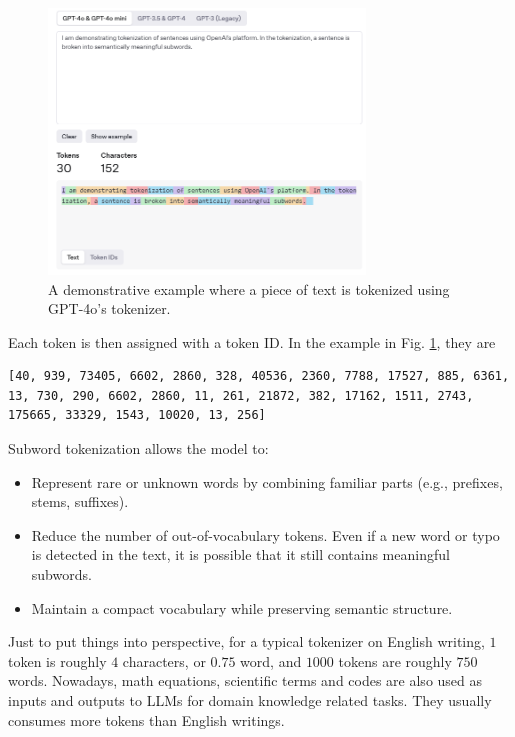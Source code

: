 \begin{figure}[!htb]
	\centering
	\includegraphics[width=0.75\textwidth]{./chapters/part-4/figures/tokenizer.png}
	\caption{A demonstrative example where a piece of text is tokenized using GPT-4o's tokenizer.}
	\label{fig:tokenizer}
\end{figure}

Each token is then assigned with a token ID. In the example in Fig. \ref{fig:tokenizer}, they are
\begin{lstlisting}
[40, 939, 73405, 6602, 2860, 328, 40536, 2360, 7788, 17527, 885, 6361, 13, 730, 290, 6602, 2860, 11, 261, 21872, 382, 17162, 1511, 2743, 175665, 33329, 1543, 10020, 13, 256]
\end{lstlisting}

Subword tokenization allows the model to:
\begin{itemize}
	\item Represent rare or unknown words by combining familiar parts (e.g., prefixes, stems, suffixes).
	\item Reduce the number of out-of-vocabulary tokens. Even if a new word or typo is detected in the text, it is possible that it still contains meaningful subwords.
	\item Maintain a compact vocabulary while preserving semantic structure.
\end{itemize}

Just to put things into perspective, for a typical tokenizer on English writing, $1$ token is roughly $4$ characters, or $0.75$ word, and $1000$ tokens are roughly $750$ words. Nowadays, math equations, scientific terms and codes are also used as inputs and outputs to LLMs for domain knowledge related tasks. They usually consumes more tokens than English writings.

